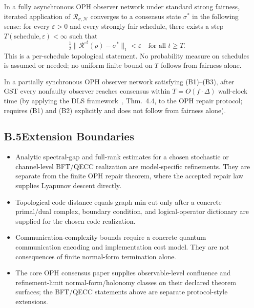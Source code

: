 \begin{theorem}
\label{thm:eventual-convergence}
In a fully asynchronous \textrm{OPH} observer network under standard
strong fairness, iterated application of $\mathcal{R}_{\sigma,\mathcal{N}}$
converges to a consensus state $\sigma^*$ in the following sense:
for every $\varepsilon>0$ and every strongly fair schedule,
there exists a step $T(\text{schedule},\varepsilon)<\infty$ such that
\[
  \tfrac12\bigl\|\mathcal{R}^{\circ t}(\rho)-\sigma^*\bigr\|_1
  <\varepsilon
  \quad\text{for all }t\geq T.
\]
This is a per-schedule topological statement.
No probability measure on schedules is assumed or needed;
no uniform finite bound on $T$ follows from fairness alone.
\end{theorem}

\begin{theorem}
\label{thm:quantitative-convergence}
In a partially synchronous \textrm{OPH} observer network satisfying
(B1)--(B3), after \textrm{GST} every nonfaulty observer reaches consensus
within $T=O(f\cdot\Delta)$ wall-clock time
(by applying the \textrm{DLS} framework~\cite{DLS88}, Thm.~4.4,
to the \textrm{OPH} repair protocol;
requires (B1) and (B2) explicitly and does not follow from fairness alone).
\end{theorem}

\subsection*{B.5\quad Extension Boundaries}

\begin{itemize}
  \item Analytic spectral-gap and full-rank estimates for a chosen stochastic or channel-level
        BFT/QECC realization are model-specific refinements. They are separate from the finite
        OPH repair theorem, where the accepted repair law supplies Lyapunov descent directly.
  \item Topological-code distance equals graph min-cut only after a concrete primal/dual
        complex, boundary condition, and logical-operator dictionary are supplied for the
        chosen code realization.
  \item Communication-complexity bounds require a concrete quantum communication encoding and
        implementation cost model. They are not consequences of finite normal-form termination
        alone.
  \item The core OPH consensus paper supplies observable-level confluence and refinement-limit
        normal-form/holonomy classes on their declared theorem surfaces; the BFT/QECC statements
        above are separate protocol-style extensions.
\end{itemize}

